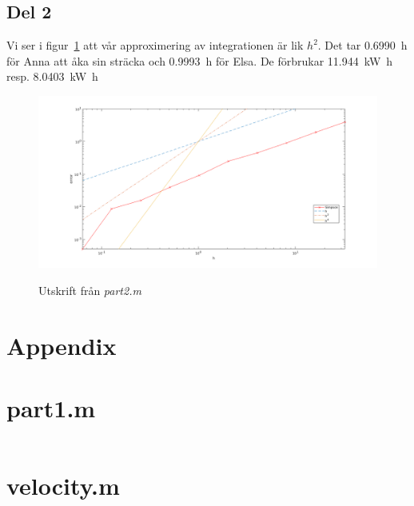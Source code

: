 \documentclass[]{scrreprt}
\begin{document}
\section{Del 2}
Vi ser i figur~\ref{fig:conv} att vår approximering av integrationen är lik \(h^2\). Det tar \SI{0.6990}{\hour} för Anna att åka sin sträcka och \SI{0.9993}{\hour} för Elsa. De förbrukar \SI{11.944}{\kilo\watt\hour} resp. \SI{8.0403}{\kilo\watt\hour}
\begin{figure}
	\caption{Utskrift  från \textit{part2.m}}
	\includegraphics[width=1.2\textwidth]{roadster/conv.png}
	\label{fig:conv}
\end{figure}
\appendix
\newpage
\chapter{Appendix}
\renewcommand\FancyVerbSpace{\textcolor{white}{\char32}}
\newcommand\emptyaccsupp[1]{\BeginAccSupp{ActualText={}}#1\EndAccSupp{}}
\let\theHFancyVerbLine\theFancyVerbLine%
\def\theFancyVerbLine{\rmfamily\tiny\emptyaccsupp{\arabic{FancyVerbLine}}}
\chapter{part1.m}
\inputminted[linenos=true,frame=leftline]{matlab}{roadster/part1.m}
%
\chapter{velocity.m}
\inputminted[linenos=true,frame=leftline]{matlab}{roadster/velocity.m}
\end{document}
